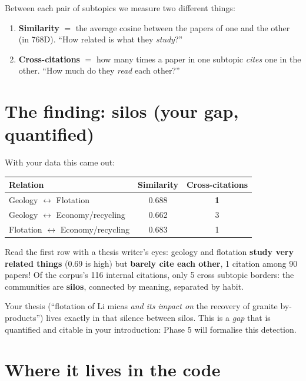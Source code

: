 \documentclass[11pt,a4paper]{article}
\begin{document}
Between each pair of subtopics we measure two different things:
\begin{enumerate}
  \item \textbf{Similarity} $=$ the average cosine between the papers of one and the other (in
        768D). ``How related is what they \emph{study}?''
  \item \textbf{Cross-citations} $=$ how many times a paper in one subtopic \emph{cites} one in
        the other. ``How much do they \emph{read} each other?''
\end{enumerate}

\section{The finding: silos (your gap, quantified)}

With your data this came out:

\begin{center}
\begin{tabular}{lcc}
\textbf{Relation} & \textbf{Similarity} & \textbf{Cross-citations} \\
\hline
Geology $\leftrightarrow$ Flotation & 0.688 & \textbf{1} \\
Geology $\leftrightarrow$ Economy/recycling & 0.662 & 3 \\
Flotation $\leftrightarrow$ Economy/recycling & 0.683 & 1 \\
\end{tabular}
\end{center}

\begin{ojo}
Read the first row with a thesis writer's eyes: geology and flotation \textbf{study very
related things} (0.69 is high) but \textbf{barely cite each other}, 1 citation among 90
papers! Of the corpus's 116 internal citations, only 5 cross subtopic borders: the communities
are \textbf{silos}, connected by meaning, separated by habit.

Your thesis (``flotation of Li micas \emph{and its impact on} the recovery of granite
by-products'') lives exactly in that silence between silos. This is a \emph{gap} that is
quantified and citable in your introduction: Phase 5 will formalise this detection.
\end{ojo}

\section{Where it lives in the code}
\end{document}
